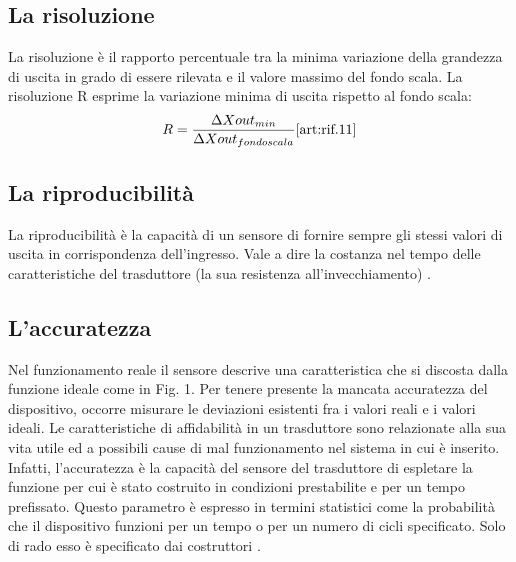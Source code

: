 \documentclass[a4paper]{report} %
\begin{document}
\subsection{La risoluzione}
La risoluzione è il rapporto percentuale tra la minima variazione della grandezza di uscita in grado di essere rilevata e il valore massimo del fondo scala.
La risoluzione R esprime la variazione minima di uscita rispetto al fondo scala:
\begin{equation}
R = \frac{\Delta Xout_{min}}{\Delta Xout_{fondo scala}} \cite{art:rif.11}
\end{equation} 

\subsection{La riproducibilità}
La riproducibilità è la capacità di un sensore di fornire sempre gli stessi valori di uscita in corrispondenza dell'ingresso. Vale a dire la costanza nel tempo delle caratteristiche del trasduttore (la sua resistenza all'invecchiamento) \cite{art:rif.11}. 

\subsection{L'accuratezza}
Nel funzionamento reale il sensore descrive una caratteristica che si discosta dalla funzione ideale come in Fig. 1. Per tenere presente la mancata accuratezza del dispositivo, occorre misurare le deviazioni esistenti fra i valori reali e i valori ideali. Le caratteristiche di affidabilità in un trasduttore sono relazionate alla sua vita utile ed a possibili cause di mal funzionamento nel sistema in cui è inserito. Infatti, l'accuratezza è la capacità del sensore del trasduttore di espletare la funzione per cui è stato costruito in condizioni prestabilite e per un tempo prefissato. Questo parametro è espresso in termini statistici come la probabilità che il dispositivo funzioni per un tempo o per un numero di cicli specificato. Solo di rado esso è specificato dai costruttori \cite{art:rif.12, art:rif.13}. 
\end{document}
